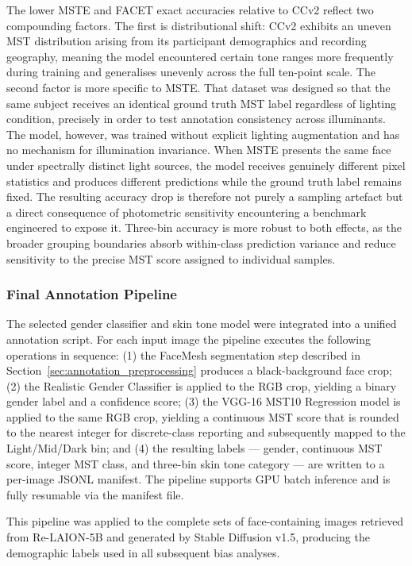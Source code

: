 The lower MSTE and FACET exact accuracies relative to CCv2 reflect two compounding factors. The first is distributional shift: CCv2 exhibits an uneven MST distribution arising from its participant demographics and recording geography, meaning the model encountered certain tone ranges more frequently during training and generalises unevenly across the full ten-point scale. The second factor is more specific to MSTE. That dataset was designed so that the same subject receives an identical ground truth MST label regardless of lighting condition, precisely in order to test annotation consistency across illuminants. The model, however, was trained without explicit lighting augmentation and has no mechanism for illumination invariance. When MSTE presents the same face under spectrally distinct light sources, the model receives genuinely different pixel statistics and produces different predictions while the ground truth label remains fixed. The resulting accuracy drop is therefore not purely a sampling artefact but a direct consequence of photometric sensitivity encountering a benchmark engineered to expose it. Three-bin accuracy is more robust to both effects, as the broader grouping boundaries absorb within-class prediction variance and reduce sensitivity to the precise MST score assigned to individual samples.

\subsubsection{Final Annotation Pipeline}

The selected gender classifier and skin tone model were integrated into a unified annotation script. For each input image the pipeline executes the following operations in sequence: (1) the FaceMesh segmentation step described in Section~\ref{sec:annotation_preprocessing} produces a black-background face crop; (2) the Realistic Gender Classifier is applied to the RGB crop, yielding a binary gender label and a confidence score; (3) the VGG-16 MST10 Regression model is applied to the same RGB crop, yielding a continuous MST score that is rounded to the nearest integer for discrete-class reporting and subsequently mapped to the Light/Mid/Dark bin; and (4) the resulting labels --- gender, continuous MST score, integer MST class, and three-bin skin tone category --- are written to a per-image JSONL manifest. The pipeline supports GPU batch inference and is fully resumable via the manifest file.

This pipeline was applied to the complete sets of face-containing images retrieved from Re-LAION-5B and generated by Stable Diffusion v1.5, producing the demographic labels used in all subsequent bias analyses.

